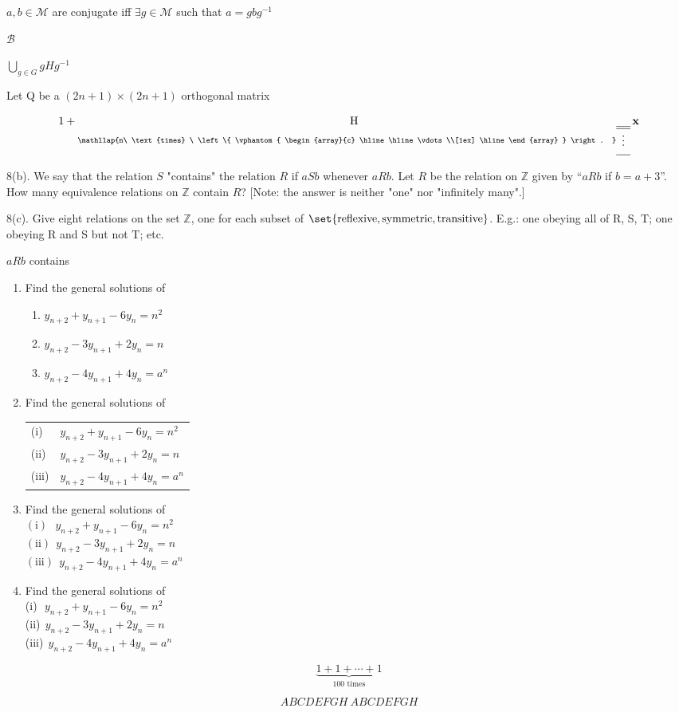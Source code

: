 \documentclass{article}
\newcommand*\tensordim[2]{
 \underset{
  \mathllap{#2\ \text{times}
  \ \left\{
   \vphantom{
    \begin{array}{c}
     \hline \hline \vdots \\[1ex] \hline
    \end{array}
   } \right.
  }
  \begin{array}{c}
   \hline \hline \vdots \\[1ex] \hline
  \end{array}
 }
 {\mathrm #1}
}
\begin{document}
\(a, b \in \mathcal M\) are conjugate iff \(\mathop\exists g \in \mathcal M\) such that \(a = g b g^{-1}\)

\(\mathscr B\)

\(\bigcup\limits_{g \in G} g H g^{-1}\)

Let Q be a \((2n+1)\times(2n+1)\) orthogonal matrix

\begin{equation*}
 1 + \tensordim{H}{n} \,\mathbf x
\end{equation*}

8(b). We say that the relation \(S\) "contains" the relation \(R\) if \(aSb\)
whenever \(aRb\).  Let \(R\) be the relation on \(\mathbb Z\) given by ``\(aRb\)
if \(b = a + 3\)''.  How many equivalence relations on \(\mathbb Z\) contain
\(R\)?  [Note: the answer is neither "one" nor "infinitely many".]

8(c). Give eight relations on the set \(\mathbb Z\), one for each subset of
\(\set{\text{reflexive}, \text{symmetric}, \text{transitive}}\).  E.g.: one
obeying all of R, S, T; one obeying R and S but not T; etc.


\(a R b\) contains

\begin{enumerate}
 \item Find the general solutions of
\begin{enumerate}[label=(\roman*)]
 \item \(y_{n + 2} + y_{n + 1} - 6 y_n = n^2\)
 \item \(y_{n + 2} - 3 y_{n + 1} + 2 y_n = n\)
 \item \(y_{n + 2} - 4 y_{n + 1} + 4 y_n = a^n\)
\end{enumerate}

\item Find the general solutions of \\
\begin{tabular}{ll}
  (i) & \(y_{n + 2} + y_{n + 1} - 6 y_n = n^2\) \\
 (ii) & \(y_{n + 2} - 3 y_{n + 1} + 2 y_n = n\) \\
(iii) & \(y_{n + 2} - 4 y_{n + 1} + 4 y_n = a^n\) \\
\end{tabular}

\item Find the general solutions of \\
\(  (\mathrm{i})\ \ \  y_{n + 2} + y_{n + 1} - 6 y_n = n^2\) \\
\( (\mathrm{ii})\ \  y_{n + 2} - 3 y_{n + 1} + 2 y_n = n\) \\
\((\mathrm{iii})\ \ y_{n + 2} - 4 y_{n + 1} + 4 y_n = a^n\)

\item Find the general solutions of \\
 (i)\(\ \ \  y_{n + 2} + y_{n + 1} - 6 y_n = n^2\) \\
 (ii)\(\ \  y_{n + 2} - 3 y_{n + 1} + 2 y_n = n\) \\
 (iii)\(\ \  y_{n + 2} - 4 y_{n + 1} + 4 y_n = a^n\)
\end{enumerate}

\begin{equation*}
 \underbrace{
  1 + 1 + \dotsb + 1
 }_{\text{\(100\) times}}
\end{equation*}

\begin{equation*}
 \mathit{ABCDEFGH}\ ABCDEFGH
\end{equation*}
\end{document}
